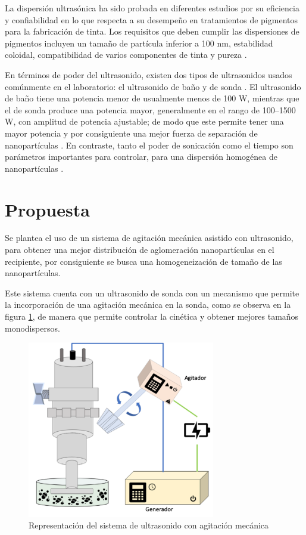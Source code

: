 \documentclass[12pt, letterpaper] {article}
\begin{document}
La dispersión ultrasónica ha sido probada en diferentes estudios por su eficiencia y confiabilidad en lo que respecta a su desempeño en tratamientos de pigmentos para la fabricación de tinta. Los requisitos que deben cumplir las dispersiones de pigmentos incluyen un tamaño de partícula inferior a 100 nm, estabilidad coloidal, compatibilidad de varios componentes de tinta y pureza \cite{UDINER} \cite{ODCNTUS}.

En términos de poder del ultrasonido, existen dos tipos de ultrasonidos usados comúnmente en el laboratorio: el ultrasonido de baño y de sonda \cite{UPSR}. El ultrasonido de baño tiene una potencia menor de usualmente menos de 100 W, mientras que el de sonda produce una potencia mayor, generalmente en el rango de 100–1500 W, con amplitud de potencia ajustable; de modo que este permite tener una mayor potencia y por consiguiente una mejor fuerza de separación de nanopartículas \cite{UDENAS}. En contraste, tanto el poder de sonicación como el tiempo son parámetros importantes para controlar, para una dispersión homogénea de nanopartículas \cite{NFDP} \cite{EUTNC}. 

\section{Propuesta}

Se plantea el uso de un sistema de agitación mecánica asistido con ultrasonido, para obtener una mejor distribución de aglomeración nanopartículas en el recipiente, por consiguiente se busca una homogeneización de tamaño de las nanopartículas. 

Este sistema cuenta con un ultrasonido de sonda con un mecanismo que permite la incorporación de una agitación mecánica en la sonda, como se observa en la figura \ref{MUSAG}, de manera que permite controlar la cinética y obtener mejores tamaños monodispersos.

\begin{figure}[H]
\centering\includegraphics[width=82mm]{USconAg.png}
\caption{Representación del sistema de ultrasonido con agitación mecánica}
\label{MUSAG}
\end{figure}
\end{document}
